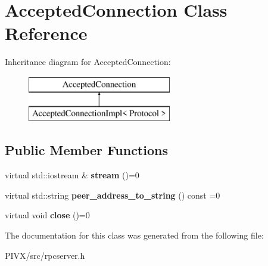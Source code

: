 \hypertarget{class_accepted_connection}{}\section{Accepted\+Connection Class Reference}
\label{class_accepted_connection}
Inheritance diagram for Accepted\+Connection\+:\begin{figure}[H]
\begin{center}
\leavevmode
\includegraphics[height=2.000000cm]{class_accepted_connection}
\end{center}
\end{figure}
\subsection*{Public Member Functions}
\begin{DoxyCompactItemize}
\item 
\mbox{\label{class_accepted_connection_a2072a12e4d8f1b79a67bc86903400a0e}} 
virtual std\+::iostream \& {\bfseries stream} ()=0
\item 
\mbox{\label{class_accepted_connection_adb2d35d48527a90078833f85249f2a56}} 
virtual std\+::string {\bfseries peer\+\_\+address\+\_\+to\+\_\+string} () const =0
\item 
\mbox{\label{class_accepted_connection_a819d5373c0d62e736fd6e0027daa2893}} 
virtual void {\bfseries close} ()=0
\end{DoxyCompactItemize}


The documentation for this class was generated from the following file\+:\begin{DoxyCompactItemize}
\item 
P\+I\+V\+X/src/rpcserver.\+h\end{DoxyCompactItemize}
